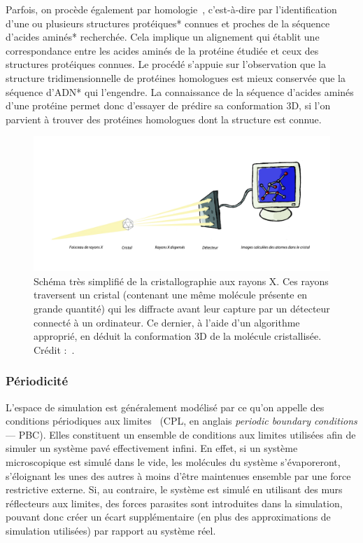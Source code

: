 	Parfois, on procède également par homologie~\cite{marti2000comparative, kaczanowski2010similar}, c'est-à-dire par l'identification d'une ou plusieurs structures protéiques* connues et proches de la séquence d'acides aminés* recherchée. Cela implique un alignement qui établit une correspondance entre les acides aminés de la protéine étudiée et ceux des structures protéiques connues. Le procédé s'appuie sur l'observation que la structure tridimensionnelle de protéines homologues est mieux conservée que la séquence d'ADN* qui l'engendre. La connaissance de la séquence d'acides aminés d'une protéine permet donc d'essayer de prédire sa conformation 3D, si l'on parvient à trouver des protéines homologues dont la structure est connue.
	
	\begin{figure}[!htbp]
		\centering
		\includegraphics[width=\textwidth]{figures/ch1/crystal}
		\caption[Schéma très simplifié de la cristallographie aux rayons X]{Schéma très simplifié de la cristallographie aux rayons X. Ces rayons traversent un cristal (contenant une même molécule présente en grande quantité) qui les diffracte avant leur capture par un détecteur connecté à un ordinateur. Ce dernier, à l'aide d'un algorithme approprié, en déduit la conformation 3D de la molécule cristallisée. Crédit :~\cite{trellet2015exploration}.}
		\label{fig:crystal}
	\end{figure}
	
	\subsubsection{Périodicité}
	L'espace de simulation est généralement modélisé par ce qu'on appelle des conditions périodiques aux limites~\cite{cheatham1995molecular} (CPL, en anglais \emph{periodic boundary conditions} --- PBC). Elles constituent un ensemble de conditions aux limites utilisées afin de simuler un système pavé effectivement infini. En effet, si un système microscopique est simulé dans le vide, les molécules du système s'évaporeront, s'éloignant les unes des autres à moins d'être maintenues ensemble par une force restrictive externe. Si, au contraire, le système est simulé en utilisant des murs réflecteurs aux limites, des forces parasites sont introduites dans la simulation, pouvant donc créer un écart supplémentaire (en plus des approximations de simulation utilisées) par rapport au système réel.
	
